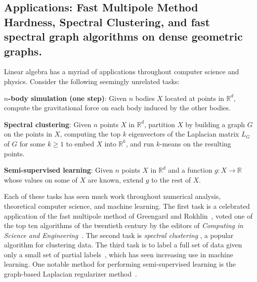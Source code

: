 \subsection{Applications: Fast Multipole Method Hardness, Spectral
  Clustering, and fast spectral graph algorithms on dense geometric
    graphs.}



Linear algebra has a myriad of applications throughout computer science
and physics. Consider the following seemingly unrelated tasks:

\vspace{1mm} \begin{tight_enumerate} \item \textbf{$n$-body simulation (one
    step)}: Given $n$ bodies $X$ located at points in $\mathbb{R}^d$,
  compute the gravitational force on each body induced by the other
  bodies.  \item \textbf{Spectral clustering}: Given $n$ points $X$ in
  $\mathbb{R}^d$, partition $X$ by building a graph $G$ on the points in
  $X$, computing the top $k$ eigenvectors of the Laplacian matrix $L_G$
  of $G$ for some $k\ge 1$ to embed $X$ into $\mathbb{R}^k$, and run
  $k$-means on the resulting points.  \item \textbf{Semi-supervised
    learning}: Given $n$ points $X$ in $\mathbb{R}^d$ and a function
    $g:X\rightarrow \mathbb{R}$ whose values on some of $X$ are known,
    extend $g$ to the rest of $X$.  \end{tight_enumerate}

\vspace{1mm}

Each of these tasks has seen much work throughout numerical analysis,
     theoretical computer science, and machine learning. The first task
     is a celebrated application of the fast multipole method of
     Greengard and Rokhlin~\cite{gr87, gr88, gr89}, voted one of the top
     ten algorithms of the twentieth century by the editors of
     \emph{Computing in Science and
       Engineering}~\cite{dongarra2000guest}.  The second task is
       \emph{spectral clustering} \cite{njw02, lwdh13}, a popular
       algorithm for clustering data. The third task is to label a full
       set of data given only a small set of partial
       labels~\cite{z05survey, csbz09, zl05}, which has seen increasing
       use in machine learning. One notable method for performing
       semi-supervised learning is the graph-based Laplacian regularizer
       method~\cite{lszlh19,zl05, bns06,z05}.

